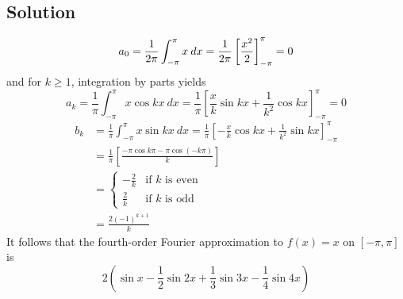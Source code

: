 \subsection*{Solution}
\[
    a_0=\frac{1}{2\pi}\int_{-\pi}^\pi x\:dx=\frac{1}{2\pi}\left[\frac{x^2}{2}\right]_{-\pi}^\pi=0\\
\]
and for $k\geq1$, integration by parts yields
\[
    a_k=\frac{1}{\pi}\int_{-\pi}^\pi x\cos{kx}\:dx=\frac{1}{\pi}\left[\frac{x}{k}\sin{kx}+\frac{1}{k^2}\cos{kx}\right]_{-\pi}^\pi=0
\]
\begin{align*}
    b_k & =\frac{1}{\pi}\int_{-\pi}^\pi x\sin{kx}\:dx=\frac{1}{\pi}\left[-\frac{x}{k}\cos{kx}+\frac{1}{k^2}\sin{kx}\right]_{-\pi}^\pi \\
        & =\frac{1}{\pi}\left[\frac{-\pi\cos{k\pi}-\pi\cos{(-k\pi)}}{k}\right]                                                        \\
        & =\begin{cases}
        -\frac{2}{k} & \text{if } k \text{ is even} \\
        \frac{2}{k}  & \text{if } k \text{ is odd}
    \end{cases}                                                                                                 \\
        & =\frac{2(-1)^{k+1}}{k}
\end{align*}
It follows that the fourth-order Fourier approximation to $f(x) = x$ on $[-\pi, \pi]$ is
\[2\left(\sin{x}-\frac{1}{2}\sin{2x}+\frac{1}{3}\sin{3x}-\frac{1}{4}\sin{4x}\right)\]